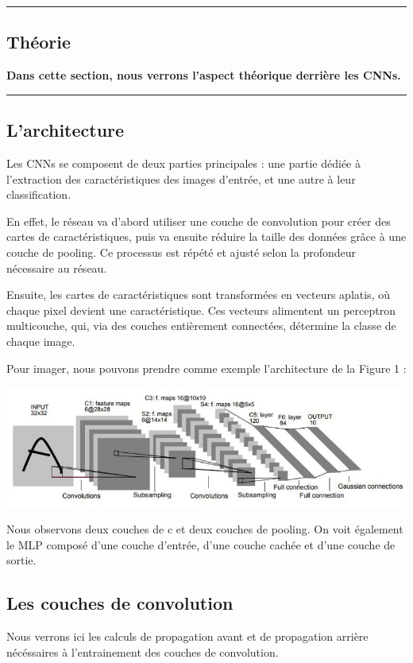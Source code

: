{\color{gray}\hrule}
\begin{center}
\section{Théorie}
\textbf{Dans cette section, nous verrons l'aspect théorique derrière les CNNs.}
\bigskip
\end{center}
{\color{gray}\hrule}
\begin{multicols}{2}
\subsection{L'architecture}
Les CNNs se composent de deux parties principales :  
une partie dédiée à l’extraction des caractéristiques des images d’entrée, et une autre 
à leur classification.

En effet, le réseau va d'abord utiliser une couche de convolution 
pour créer des cartes de caractéristiques, puis va ensuite réduire la taille des 
données grâce à une couche de pooling. 
Ce processus est répété et ajusté selon la profondeur nécessaire au réseau.

Ensuite, les cartes de caractéristiques sont transformées en vecteurs aplatis, 
où chaque pixel devient une caractéristique. Ces vecteurs alimentent un perceptron
multicouche, qui, via des couches entièrement connectées, détermine la classe de 
chaque image.

Pour imager, nous pouvons prendre comme exemple l'architecture de la Figure 1 : 


\includegraphics[width=\columnwidth]{images/lenet5.jpeg}
\hfill\break

Nous observons deux couches de c et deux couches de pooling. On voit également le  
MLP composé d'une couche d'entrée, d'une couche cachée et d'une couche de sortie.

\subsection{Les couches de convolution}
Nous verrons ici les calculs de propagation avant et de propagation arrière nécéssaires 
à l'entrainement des couches de convolution.\\


\end{multicols}
